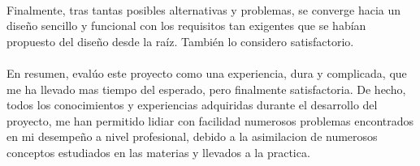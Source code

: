 \paragraph{}
Finalmente, tras tantas posibles alternativas y problemas, se converge hacia un diseño sencillo y funcional con los requisitos tan exigentes que se habían propuesto del diseño desde la raíz. 
Tambi\'en lo considero satisfactorio.

\paragraph{}
En resumen, eval\'uo este proyecto como una experiencia, dura y complicada, que me ha llevado mas tiempo del esperado, pero finalmente satisfactoria. 
De hecho, todos los conocimientos y experiencias adquiridas durante el desarrollo del proyecto, me han permitido lidiar con facilidad numerosos problemas encontrados en mi desempeño a nivel profesional, debido a la asimilacion de numerosos conceptos estudiados en las materias y llevados a la practica.
